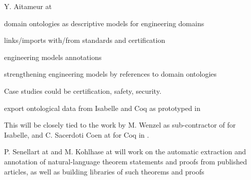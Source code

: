 \begin{workpackage}
\begin{tasklist}
\begin{task}[id=strdomonto,title= Domain Ontologies Ontologies for Formal Methods in SE,lead=Tou,TouRM=12, SacRM=6]
Y. Aitameur at 
\begin{compactitem}
\item domain ontologies as descriptive models for engineering domains 
\item links/imports with/from standards and certification
\item engineering models annotations
\item strengthening engineering models by references to domain ontologies
\item Case studies could be certification, safety, security.
\end{compactitem}
\end{task} 

\begin{task}[id=strontorepml,title=Ontological Representation for Major Libraries,lead=Fau,FauRM=10,BolRM=6,SacRM=6]
export ontological data from Isabelle and Coq as prototyped in \cite{ulo}

This will be closely tied to the work by M. Wenzel as sub-contractor of  for Isabelle, and C. Sacerdoti Coen at  for Coq in .
\end{task} 



\begin{task}[id=strtext,title=Extraction from Natural Language
  Statements,lead=Inr,FauRM=6,InrRM=15]
P. Senellart at  and M. Kohlhase at  will work on the automatic extraction and annotation of natural-language theorem statements and proofs from published articles, as well as building libraries of such theorems and proofs
  
\end{task} 


\end{tasklist}
\end{workpackage}
